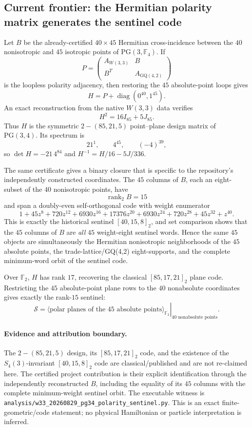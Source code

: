 \subsection*{Current frontier: the Hermitian polarity matrix generates the sentinel code}

Let \(B\) be the already-certified \(40\times45\) Hermitian cross-incidence
between the \(40\) nonisotropic and \(45\) isotropic points of
\(\mathrm{PG}(3,\mathbb{F}_4)\). If
\[
 P=\begin{pmatrix}A_{W(3,3)}&B\\ B^T&A_{\mathrm{GQ}(4,2)}\end{pmatrix}
\]
is the loopless polarity adjacency, then restoring the \(45\) absolute-point
loops gives
\[
 H=P+\operatorname{diag}(0^{40},1^{45}).
\]
An exact reconstruction from the native \(W(3,3)\) data verifies
\[
 \boxed{H^2=16I_{85}+5J_{85}}.
\]
Thus \(H\) is the symmetric \(2\!-\!(85,21,5)\) point--plane design matrix of
\(\mathrm{PG}(3,4)\). Its spectrum is
\[
 21^1,\qquad 4^{45},\qquad(-4)^{39},
\]
so \(\det H=-21\,4^{84}\) and
\(H^{-1}=H/16-5J/336\).

The same certificate gives a binary closure that is specific to the
repository's independently constructed coordinates. The \(45\) columns of
\(B\), each an eight-subset of the \(40\) nonisotropic points, have
\[
 \operatorname{rank}_{2}B=15
\]
and span a doubly-even self-orthogonal code with weight enumerator
\[
 1+45z^8+720z^{12}+6930z^{16}+17376z^{20}
 +6930z^{24}+720z^{28}+45z^{32}+z^{40}.
\]
This is exactly the historical sentinel \([40,15,8]_2\), and set comparison
shows that the \(45\) columns of \(B\) are \emph{all} \(45\) weight-eight
sentinel words. Hence the same \(45\) objects are simultaneously the
Hermitian nonisotropic neighborhoods of the \(45\) absolute points, the
trade-lattice/GQ(4,2) eight-supports, and the complete minimum-word orbit of
the sentinel code.

Over \(\mathbb{F}_2\), \(H\) has rank \(17\), recovering the classical
\([85,17,21]_2\) plane code. Restricting the \(45\) absolute-point plane rows
to the \(40\) nonabsolute coordinates gives exactly the rank-\(15\) sentinel:
\[
 \boxed{\;
 \mathcal S=
 \left.
 \langle\text{polar planes of the 45 absolute points}\rangle_{\mathbb{F}_2}
 \right|_{\text{40 nonabsolute points}}.
 \;}
\]

\paragraph{Evidence and attribution boundary.}
The \(2\!-\!(85,21,5)\) design, its \([85,17,21]_2\) code, and the existence
of the \(S_4(3)\)-invariant \([40,15,8]_2\) code are classical/published and
are not re-claimed here. The certified project contribution is their explicit
identification through the independently reconstructed \(B\), including the
equality of its \(45\) columns with the complete minimum-weight sentinel orbit.
The executable witness is
\texttt{analysis/w33\_20260829\_pg34\_polarity\_sentinel.py}.
This is an exact finite-geometric/code statement; no physical Hamiltonian or
particle interpretation is inferred.
